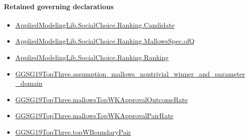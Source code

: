 \documentclass[10pt]{article}
\begin{document}
\paragraph{Retained governing declarations}
\begin{itemize}\raggedright
\item \hyperlink{governing-declaration-8c0e6c25845ae78a}{Applied\allowbreak{}Modeling\allowbreak{}Lib.\allowbreak{}Social\allowbreak{}Choice.\allowbreak{}Ranking.\allowbreak{}Candidate}
\item \hyperlink{governing-declaration-f535cdda3f27d5b4}{Applied\allowbreak{}Modeling\allowbreak{}Lib.\allowbreak{}Social\allowbreak{}Choice.\allowbreak{}Ranking.\allowbreak{}Mallows\allowbreak{}Spec.\allowbreak{}of\allowbreak{}Q}
\item \hyperlink{governing-declaration-5cde54446d1ae021}{Applied\allowbreak{}Modeling\allowbreak{}Lib.\allowbreak{}Social\allowbreak{}Choice.\allowbreak{}Ranking.\allowbreak{}Ranking}
\item \hyperlink{paper-prerequisite-295f37487ff2fcbb}{GGSG19\allowbreak{}Top\allowbreak{}Three.\allowbreak{}assumption\_\allowbreak{}mallows\_\allowbreak{}nontrivial\_\allowbreak{}winner\_\allowbreak{}and\_\allowbreak{}parameter\_\allowbreak{}domain}
\item \hyperlink{governing-declaration-9477f8aa848ebd61}{GGSG19\allowbreak{}Top\allowbreak{}Three.\allowbreak{}mallows\allowbreak{}Top\allowbreak{}WK\allowbreak{}Approval\allowbreak{}Outcome\allowbreak{}Rate}
\item \hyperlink{governing-declaration-a6c8920c95fcd04a}{GGSG19\allowbreak{}Top\allowbreak{}Three.\allowbreak{}mallows\allowbreak{}Top\allowbreak{}WK\allowbreak{}Approval\allowbreak{}Pair\allowbreak{}Rate}
\item \hyperlink{governing-declaration-bbe25196a9ddcb6f}{GGSG19\allowbreak{}Top\allowbreak{}Three.\allowbreak{}top\allowbreak{}W\allowbreak{}Boundary\allowbreak{}Pair}
\end{itemize}
\end{document}
